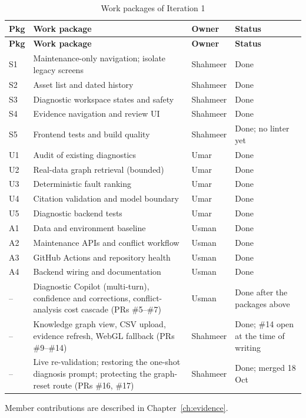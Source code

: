 \begin{longtable}{p{}p{}p{}p{}}
\caption{Work packages of Iteration 1}\label{tab:wp}\\
\toprule \textbf{Pkg} & \textbf{Work package} & \textbf{Owner} & \textbf{Status} \\ \midrule \endfirsthead
\toprule \textbf{Pkg} & \textbf{Work package} & \textbf{Owner} & \textbf{Status} \\ \midrule \endhead
S1 & Maintenance-only navigation; isolate legacy screens & Shahmeer & Done \\
S2 & Asset list and dated history & Shahmeer & Done \\
S3 & Diagnostic workspace states and safety & Shahmeer & Done \\
S4 & Evidence navigation and review UI & Shahmeer & Done \\
S5 & Frontend tests and build quality & Shahmeer & Done; no linter yet \\
U1 & Audit of existing diagnostics & Umar & Done \\
U2 & Real-data graph retrieval (bounded) & Umar & Done \\
U3 & Deterministic fault ranking & Umar & Done \\
U4 & Citation validation and model boundary & Umar & Done \\
U5 & Diagnostic backend tests & Umar & Done \\
A1 & Data and environment baseline & Usman & Done \\
A2 & Maintenance APIs and conflict workflow & Usman & Done \\
A3 & GitHub Actions and repository health & Usman & Done \\
A4 & Backend wiring and documentation & Usman & Done \\
-- & Diagnostic Copilot (multi-turn), confidence and corrections, conflict-analysis cost cascade (PRs \#5--\#7) & Usman & Done after the packages above \\
-- & Knowledge graph view, CSV upload, evidence refresh, WebGL fallback (PRs \#9--\#14) & Shahmeer & Done; \#14 open at the time of writing \\
-- & Live re-validation; restoring the one-shot diagnosis prompt; protecting the graph-reset route (PRs \#16, \#17) & Shahmeer & Done; merged 18 Oct \\
\bottomrule
\end{longtable}
Member contributions are described in Chapter~\ref{ch:evidence}.

